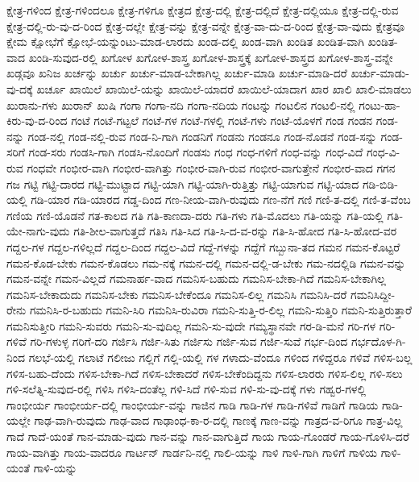 {ಕ್ಷೇತ್ರ-ಗಳಿಂದ
ಕ್ಷೇತ್ರ-ಗಳಿಂದಲೂ
ಕ್ಷೇತ್ರ-ಗಳಿಗೂ
ಕ್ಷೇತ್ರದ
ಕ್ಷೇತ್ರ-ದಲ್ಲಿ
ಕ್ಷೇತ್ರ-ದಲ್ಲಿದೆ
ಕ್ಷೇತ್ರ-ದಲ್ಲಿಯೂ
ಕ್ಷೇತ್ರ-ದಲ್ಲಿ-ರುವ
ಕ್ಷೇತ್ರ-ದಲ್ಲಿ-ರು-ವು-ದ-ರಿಂದ
ಕ್ಷೇತ್ರ-ದಲ್ಲೇ
ಕ್ಷೇತ್ರ-ವನ್ನು
ಕ್ಷೇತ್ರ-ವನ್ನೇ
ಕ್ಷೇತ್ರ-ವಾ-ದು-ದ-ರಿಂದ
ಕ್ಷೇತ್ರ-ವಾ-ವುದು
ಕ್ಷೇತ್ರವೂ
ಕ್ಷೇಮ
ಕ್ಷೋಭೆಗೆ
ಕ್ಷೋಭೆ-ಯನ್ನುಂಟು-ಮಾಡ-ಲಾರದು
ಖಂಡ-ದಲ್ಲಿ
ಖಂಡ-ವಾಗಿ
ಖಂಡಿತ
ಖಂಡಿತ-ವಾಗಿ
ಖಂಡಿತ-ವಾದ
ಖಂಡಿ-ಸುವುದ-ರಲ್ಲಿ
ಖಗೋಳ
ಖಗೋಳ-ಶಾಸ್ತ್ರ
ಖಗೋಳ-ಶಾಸ್ತ್ರಕ್ಕೆ
ಖಗೋಳ-ಶಾಸ್ತ್ರದ
ಖಗೋಳ-ಶಾಸ್ತ್ರ-ವನ್ನೇ
ಖಡ್ಗವೂ
ಖನಿಜ
ಖರ್ಚನ್ನು
ಖರ್ಚು
ಖರ್ಚು-ಮಾಡ-ಬೇಕಾಗಿಲ್ಲ
ಖರ್ಚು-ಮಾಡಿ
ಖರ್ಚು-ಮಾಡಿ-ದರೆ
ಖರ್ಚು-ಮಾಡು-ವು-ದಕ್ಕೆ
ಖರ್ಚೂ
ಖಾಯಿಲೆ
ಖಾಯಿಲೆ-ಯನ್ನು
ಖಾಯಿಲೆ-ಯಾದರೆ
ಖಾಯಿಲೆ-ಯಾದಾಗ
ಖಾರ
ಖಾಲಿ
ಖಾಲಿ-ಮಾಡಲು
ಖುರಾನು-ಗಳು
ಖುರಾನ್
ಖುಷಿ
ಗಂಗಾ
ಗಂಗಾ-ನದಿ
ಗಂಗಾ-ನದಿಯ
ಗಂಟನ್ನು
ಗಂಟಲಿನ
ಗಂಟಲಿ-ನಲ್ಲಿ
ಗಂಟು-ಹಾ-ಕಿರು-ವು-ದ-ರಿಂದ
ಗಂಟೆ
ಗಂಟೆ-ಗಟ್ಟಲೆ
ಗಂಟೆ-ಗಳ
ಗಂಟೆ-ಗಳಲ್ಲಿ
ಗಂಟೆ-ಗಳು
ಗಂಟೆ-ಯೊಳಗೆ
ಗಂಡ
ಗಂಡನ
ಗಂಡ-ನನ್ನು
ಗಂಡ-ನಲ್ಲಿ
ಗಂಡ-ನಲ್ಲಿ-ರುವ
ಗಂಡ-ನಿ-ಗಾಗಿ
ಗಂಡನಿಗೆ
ಗಂಡನು
ಗಂಡನೂ
ಗಂಡ-ನೊಡನೆ
ಗಂಡ-ಸನ್ನು
ಗಂಡ-ಸರಿಗೆ
ಗಂಡ-ಸರು
ಗಂಡಸಿ-ಗಾಗಿ
ಗಂಡಸಿ-ನೊಂದಿಗೆ
ಗಂಡಸು
ಗಂಧ
ಗಂಧ-ಗಳಿಗೆ
ಗಂಧ-ವನ್ನು
ಗಂಧ-ವಿದೆ
ಗಂಧ-ವಿ-ರುವ
ಗಂಧವೇ
ಗಂಭೀರ-ವಾಗಿ
ಗಂಭೀರ-ವಾಗಿತ್ತು
ಗಂಭೀರ-ವಾಗಿ-ರುವ
ಗಂಭೀರ-ವಾಗುತ್ತೇನೆ
ಗಂಭೀರ-ವಾದ
ಗಗನ
ಗಜ
ಗಟ್ಟಿ
ಗಟ್ಟಿ-ದಾರದ
ಗಟ್ಟಿ-ಮುಟ್ಟಾದ
ಗಟ್ಟಿ-ಯಾಗಿ
ಗಟ್ಟಿ-ಯಾಗಿ-ರುತ್ತಿತ್ತು
ಗಟ್ಟಿ-ಯಾಗುವ
ಗಟ್ಟಿ-ಯಾದ
ಗಡಿ-ಬಿಡಿ-ಯಲ್ಲಿ
ಗಡಿ-ಯಾರ
ಗಡಿ-ಯಾರದ
ಗಡ್ಡ-ದಿಂದ
ಗಣ-ನೀಯ-ವಾಗಿ-ರುವುದು
ಗಣ-ನೆಗೆ
ಗಣಿ
ಗಣಿ-ತ-ದಲ್ಲಿ
ಗಣಿ-ತ-ವೆಂಬ
ಗಣಿಯ
ಗಣಿ-ಯೊಡನೆ
ಗತ-ಕಾಲದ
ಗತಿ
ಗತಿ-ಕಾಣದಾ-ದರು
ಗತಿ-ಗಳು
ಗತಿ-ಮೊದಲು
ಗತಿ-ಯನ್ನು
ಗತಿ-ಯಲ್ಲಿ
ಗತಿ-ಯೇ-ನಾಗು-ವುದು
ಗತಿ-ಶೀಲ-ವಾಗುತ್ತದೆ
ಗತಿಸಿ
ಗತಿ-ಸಿದ
ಗತಿ-ಸಿ-ದ-ವ-ರನ್ನು
ಗತಿ-ಸಿ-ಹೋದ
ಗತಿ-ಸಿ-ಹೋದ-ವರ
ಗದ್ದಲ-ಗಳ
ಗದ್ದಲ-ಗಳಿಲ್ಲದೆ
ಗದ್ದಲ-ದಿಂದ
ಗದ್ದಲ-ವಿದೆ
ಗದ್ದೆ-ಗಳನ್ನು
ಗದ್ದೆಗೆ
ಗಬ್ಬುನಾ-ತದ
ಗಮನ
ಗಮನ-ಕೊಟ್ಟರೆ
ಗಮನ-ಕೊಡ-ಬೇಕು
ಗಮನ-ಕೊಡಲು
ಗಮ-ನಕ್ಕೆ
ಗಮನ-ದಲ್ಲಿ
ಗಮನ-ದಲ್ಲಿ-ಡ-ಬೇಕು
ಗಮ-ನದಲ್ಲಿಡಿ
ಗಮನ-ವನ್ನು
ಗಮನ-ವನ್ನೇ
ಗಮನ-ವಿಲ್ಲದೆ
ಗಮನಾರ್ಹ-ವಾದ
ಗಮನಿಸ-ಬಹುದು
ಗಮನಿಸ-ಬೇಕಾ-ಗಿದೆ
ಗಮನಿಸ-ಬೇಕಾಗಿಲ್ಲ
ಗಮನಿಸ-ಬೇಕಾದುದು
ಗಮನಿಸ-ಬೇಕು
ಗಮನಿಸ-ಬೇಕೆಂದೂ
ಗಮನಿಸ-ಲಿಲ್ಲ
ಗಮನಿಸಿ
ಗಮನಿಸಿ-ದರೆ
ಗಮನಿಸಿದ್ದೀ-ರೇನು
ಗಮನಿಸಿ-ರ-ಬಹುದು
ಗಮನಿ-ಸಿರಿ
ಗಮನಿಸಿ-ರುವಿರಾ
ಗಮನಿ-ಸುತ್ತಿ-ರ-ಲಿಲ್ಲ
ಗಮನಿ-ಸುತ್ತಿರಿ
ಗಮನಿ-ಸುತ್ತಿರುತ್ತಾರೆ
ಗಮನಿಸುತ್ತೀರಿ
ಗಮನಿ-ಸುವರು
ಗಮನಿ-ಸು-ವುದಿಲ್ಲ
ಗಮನಿ-ಸು-ವುದೇ
ಗಮ್ಯಸ್ಥಾನವೇ
ಗರ-ಡಿ-ಮನೆ
ಗರಿ-ಗಳ
ಗರಿ-ಗಳಿವೆ
ಗರಿ-ಗಳುಳ್ಳ
ಗರಿಗೆ-ದರಿ
ಗರ್ಜಿಸಿ
ಗರ್ಜಿ-ಸಿತು
ಗರ್ಜಿಸು
ಗರ್ಜಿ-ಸುವ
ಗರ್ಜಿ-ಸುವೆ
ಗರ್ಭ-ದಿಂದ
ಗರ್ಭದೊಳ-ಗಿ-ನಿಂದ
ಗಲಭೆ-ಯಲ್ಲಿ
ಗಲಾಟೆ
ಗಲೀಜು
ಗಲ್ಲಿಗೆ
ಗಲ್ಲಿ-ಯಲ್ಲಿ
ಗಳ
ಗಳಾದು-ವೆಂದೂ
ಗಳಿಂದ
ಗಳಿದ್ದರೂ
ಗಳಿವೆ
ಗಳಿಸ-ಬಲ್ಲ
ಗಳಿಸ-ಬಹು-ದೆಂದು
ಗಳಿಸ-ಬೇಕಾ-ಗಿದೆ
ಗಳಿಸ-ಬೇಕಾದರೆ
ಗಳಿಸ-ಬೇಕೆಂದಿದ್ದನು
ಗಳಿಸ-ಲಾರರು
ಗಳಿಸ-ಲಿಲ್ಲ
ಗಳಿ-ಸಲು
ಗಳಿ-ಸಲೆತ್ನಿ-ಸುವುದ-ರಲ್ಲಿ
ಗಳಿಸಿ
ಗಳಿಸಿ-ದಂತೆಲ್ಲ
ಗಳಿ-ಸಿದೆ
ಗಳಿ-ಸುವ
ಗಳಿ-ಸು-ವು-ದಕ್ಕೆ
ಗಳು
ಗಹ್ವರ-ಗಳಲ್ಲಿ
ಗಾಂಭೀರ್ಯ
ಗಾಂಭೀರ್ಯ-ದಲ್ಲಿ
ಗಾಂಭೀರ್ಯ-ವನ್ನು
ಗಾಜಿನ
ಗಾಡಿ
ಗಾಡಿ-ಗಳ
ಗಾಡಿ-ಗಳಿವೆ
ಗಾಡಿಗೆ
ಗಾಡಿಯ
ಗಾಡಿ-ಯಲ್ಲೇ
ಗಾಢ-ವಾಗಿ-ರುವುದು
ಗಾಢ-ವಾದ
ಗಾಢಾಂಧ-ಕಾ-ರ-ದಲ್ಲಿ
ಗಾಣಕ್ಕೆ
ಗಾಣ-ವನ್ನು
ಗಾತ್ರದ-ವ-ರಿಗೂ
ಗಾತ್ರ-ವಿಲ್ಲ
ಗಾದೆ
ಗಾದೆ-ಯಂತೆ
ಗಾನ-ಮಾಡು-ವುದು
ಗಾನ-ವನ್ನು
ಗಾನ-ವಾಗುತ್ತಿದೆ
ಗಾಯ
ಗಾಯ-ಗೊಂಡರೆ
ಗಾಯ-ಗೊಳಿಸಿ-ದರೆ
ಗಾಯ-ವಾಗಿತ್ತು
ಗಾಯ-ವಾದರೂ
ಗಾರ್ಟನ್
ಗಾರ್ಡನಿ-ನಲ್ಲಿ
ಗಾಲಿ-ಯನ್ನು
ಗಾಳಿ
ಗಾಳಿ-ಗಾಗಿ
ಗಾಳಿಗೆ
ಗಾಳಿಯ
ಗಾಳಿ-ಯಂತೆ
ಗಾಳಿ-ಯನ್ನು
}
